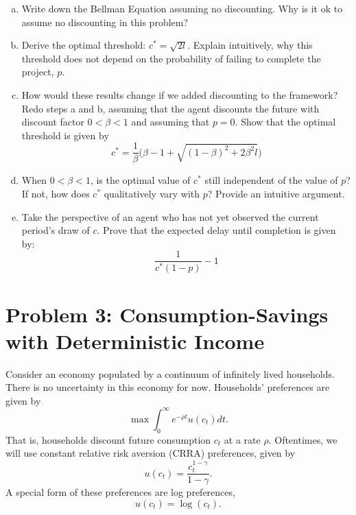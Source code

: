 \documentclass[11pt]{extarticle}
\theoremstyle{plain}
\theoremstyle{definition}
\begin{document}
\vspace{2mm}
\begin{enumerate}[(a)]
\item Write down the Bellman Equation assuming no discounting. Why is it ok to assume no discounting in this problem?

\item Derive the optimal threshold: $c^* = \sqrt{2l}$. Explain intuitively, why this threshold does not depend on the probability of failing to complete the project, $p$. 

\item How would these results change if we added discounting to the framework? Redo steps a and b, assuming that the agent discounts the future with discount factor $0 < \beta < 1$ and assuming that $p = 0$. Show that the optimal threshold is given by
\begin{equation*}
	c^* = \frac{1}{\beta} \bigg( \beta - 1 + \sqrt{ (1-\beta)^2 + 2 \beta^2 l } \bigg)
\end{equation*}

\item When $0 < \beta < 1$, is the optimal value of $c^*$ still independent of the value of $p$? If not, how does $c^*$ qualitatively vary with $p$? Provide an intuitive argument.

\item Take the perspective of an agent who has not yet observed the current period's draw of $c$. Prove that the expected delay until completion is given by:
\begin{equation*}
	\frac{1}{c^*(1-p)} - 1
\end{equation*}

\end{enumerate}


\newpage
\section*{Problem 3: Consumption-Savings with Deterministic Income}

Consider an economy populated by a continuum of infinitely lived households. There is no uncertainty in this economy for now. Households' preferences are given by
\begin{equation*}
	\max \int_0^\infty e^{-\rho t} u(c_t) dt.
\end{equation*}
That is, households discount future consumption $c_t$ at a rate $\rho$. Oftentimes, we will use constant relative risk aversion (CRRA) preferences, given by
\begin{equation*}
	u(c_t) = \frac{c_t^{1-\gamma}}{1-\gamma}.
\end{equation*}
A special form of these preferences are log preferences, 
\begin{equation*}
	u(c_t) = \log(c_t). 
\end{equation*}
\end{document}
